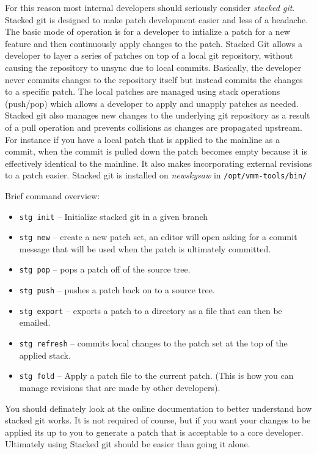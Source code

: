 \documentclass[11pt]{article}
\begin{document}
For this reason most internal developers should seriously consider
{\em stacked git}. Stacked git is designed to make patch development
easier and less of a headache. The basic mode of operation is for a
developer to intialize a patch for a new feature and then continuously
apply changes to the patch. Stacked Git allows a developer to layer a
series of patches on top of a local git repository, without causing
the repository to unsync due to local commits. Basically, the
developer never commits changes to the repository itself but instead
commits the changes to a specific patch. The local patches are managed
using stack operations (push/pop) which allows a developer to apply
and unapply patches as needed. Stacked git also manages new changes to
the underlying git repository as a result of a pull operation and
prevents collisions as changes are propagated upstream. For instance
if you have a local patch that is applied to the mainline as a commit,
when the commit is pulled down the patch becomes empty because it is
effectively identical to the mainline. It also makes incorporating
external revisions to a patch easier. Stacked git is installed on {\em
newskysaw} in \verb./opt/vmm-tools/bin/. 

Brief command overview:
\begin{itemize}
\item \verb.stg init. -- Initialize stacked git in a given branch
\item \verb.stg new. -- create a new patch set, an editor will open
asking for a commit message that will be used when the patch is
ultimately committed.
\item \verb.stg pop. -- pops a patch off of the source tree.
\item \verb.stg push. -- pushes a patch back on to a source tree.
\item \verb.stg export. -- exports a patch to a directory as a file
that can then be emailed.
\item \verb.stg refresh. -- commits local changes to the patch set at
the top of the applied stack.
\item \verb.stg fold. -- Apply a patch file to the current
patch. (This is how you can manage revisions that are made by other developers).
\end{itemize}

You should definately look at the online documentation to better
understand how stacked git works. It is not required of course, but if
you want your changes to be applied its up to you to generate a patch
that is acceptable to a core developer. Ultimately using Stacked git
should be easier than going it alone.
\end{document}
